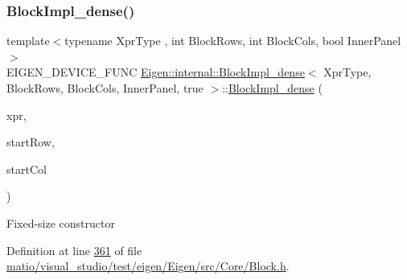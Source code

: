 \mbox{\label{class_eigen_1_1internal_1_1_block_impl__dense_3_01_xpr_type_00_01_block_rows_00_01_block_cols_00_01_inner_panel_00_01true_01_4_aaa47737cd19396275d5bcb6d9520e49f}} 
\subsubsection{\texorpdfstring{Block\+Impl\+\_\+dense()}{BlockImpl\_dense()}\hspace{0.1cm}{\footnotesize\ttfamily [5/6]}}
{\footnotesize\ttfamily template$<$typename Xpr\+Type , int Block\+Rows, int Block\+Cols, bool Inner\+Panel$>$ \\
E\+I\+G\+E\+N\+\_\+\+D\+E\+V\+I\+C\+E\+\_\+\+F\+U\+NC \hyperlink{class_eigen_1_1internal_1_1_block_impl__dense}{Eigen\+::internal\+::\+Block\+Impl\+\_\+dense}$<$ Xpr\+Type, Block\+Rows, Block\+Cols, Inner\+Panel, true $>$\+::\hyperlink{class_eigen_1_1internal_1_1_block_impl__dense}{Block\+Impl\+\_\+dense} (\begin{DoxyParamCaption}\item[{Xpr\+Type \&}]{xpr,  }\item[{\hyperlink{namespace_eigen_a62e77e0933482dafde8fe197d9a2cfde}{Index}}]{start\+Row,  }\item[{\hyperlink{namespace_eigen_a62e77e0933482dafde8fe197d9a2cfde}{Index}}]{start\+Col }\end{DoxyParamCaption})\hspace{0.3cm}{\ttfamily [inline]}}

Fixed-\/size constructor 

Definition at line \hyperlink{matio_2visual__studio_2test_2eigen_2_eigen_2src_2_core_2_block_8h_source_l00361}{361} of file \hyperlink{matio_2visual__studio_2test_2eigen_2_eigen_2src_2_core_2_block_8h_source}{matio/visual\+\_\+studio/test/eigen/\+Eigen/src/\+Core/\+Block.\+h}.

